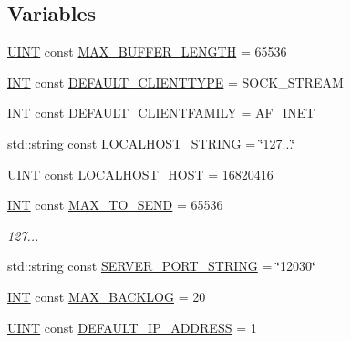 \subsection*{Variables}
\begin{DoxyCompactItemize}
\item 
\hyperlink{typedefs_8h_a2e2c38961834f28c06e17e074eb00bc7}{U\+I\+N\+T} const \hyperlink{namespace_communication_a369209f66df3d0e47bb8982dd0f320dd}{M\+A\+X\+\_\+\+B\+U\+F\+F\+E\+R\+\_\+\+L\+E\+N\+G\+T\+H} = 65536
\item 
\hyperlink{typedefs_8h_a0240b856f74f8905ed334a5a0ca624e5}{I\+N\+T} const \hyperlink{namespace_communication_ad6fde83c010ea3d449795bbb03175f78}{D\+E\+F\+A\+U\+L\+T\+\_\+\+C\+L\+I\+E\+N\+T\+T\+Y\+P\+E} = S\+O\+C\+K\+\_\+\+S\+T\+R\+E\+A\+M
\item 
\hyperlink{typedefs_8h_a0240b856f74f8905ed334a5a0ca624e5}{I\+N\+T} const \hyperlink{namespace_communication_a223fb743e5d0e3ff77f6bc1e85dd232e}{D\+E\+F\+A\+U\+L\+T\+\_\+\+C\+L\+I\+E\+N\+T\+F\+A\+M\+I\+L\+Y} = A\+F\+\_\+\+I\+N\+E\+T
\item 
std\+::string const \hyperlink{namespace_communication_ade8e9b7a2372d054473ab7f0d46526db}{L\+O\+C\+A\+L\+H\+O\+S\+T\+\_\+\+S\+T\+R\+I\+N\+G} = \char`\"{}127...\char`\"{}
\item 
\hyperlink{typedefs_8h_a2e2c38961834f28c06e17e074eb00bc7}{U\+I\+N\+T} const \hyperlink{namespace_communication_a5452af75879199416462fa5c00cd6aee}{L\+O\+C\+A\+L\+H\+O\+S\+T\+\_\+\+H\+O\+S\+T} = 16820416
\item 
\hyperlink{typedefs_8h_a0240b856f74f8905ed334a5a0ca624e5}{I\+N\+T} const \hyperlink{namespace_communication_a74040d78a5662f3bfdf04a041b92c705}{M\+A\+X\+\_\+\+T\+O\+\_\+\+S\+E\+N\+D} = 65536
\begin{DoxyCompactList}\small\item\em 127... \end{DoxyCompactList}\item 
std\+::string const \hyperlink{namespace_communication_a884c249a47d85e8847b1b147b5e66ada}{S\+E\+R\+V\+E\+R\+\_\+\+P\+O\+R\+T\+\_\+\+S\+T\+R\+I\+N\+G} = \char`\"{}12030\char`\"{}
\item 
\hyperlink{typedefs_8h_a0240b856f74f8905ed334a5a0ca624e5}{I\+N\+T} const \hyperlink{namespace_communication_aeb78e3ef9fb26a4967e9dc221207d598}{M\+A\+X\+\_\+\+B\+A\+C\+K\+L\+O\+G} = 20
\item 
\hyperlink{typedefs_8h_a2e2c38961834f28c06e17e074eb00bc7}{U\+I\+N\+T} const \hyperlink{namespace_communication_a030bef1f289bbc5820b6b260d6c937d2}{D\+E\+F\+A\+U\+L\+T\+\_\+\+I\+P\+\_\+\+A\+D\+D\+R\+E\+S\+S} = 1

\end{DoxyCompactItemize}
